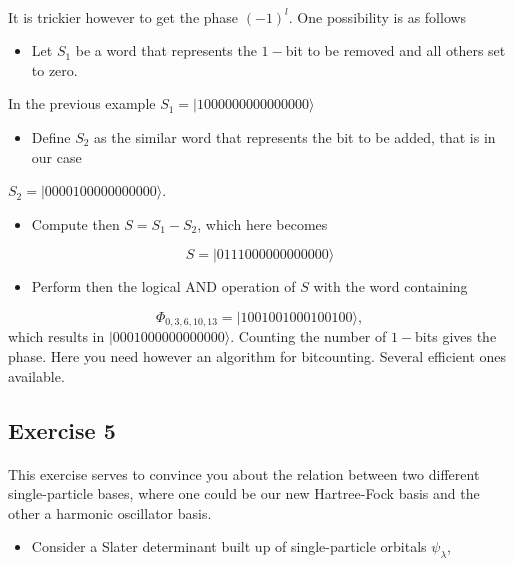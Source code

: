 \documentclass[%
twoside,                 %
final,                   %
10pt]{article}
\begin{document}
\paragraph{}
It is trickier however to get the phase $(-1)^l$. 
One possibility is as follows
\begin{itemize}
\item Let $S_1$ be a word that represents the $1-$bit to be removed and all others set to zero.
\end{itemize}

\noindent
In the previous example $S_1=|1000000000000000\rangle$
\begin{itemize}
\item Define $S_2$ as the similar word that represents the bit to be added, that is in our case
\end{itemize}

\noindent
$S_2=|0000100000000000\rangle$.
\begin{itemize}
\item Compute then $S=S_1-S_2$, which here becomes
\end{itemize}

\noindent
\[
S=|0111000000000000\rangle
\]
\begin{itemize}
\item Perform then the logical AND operation of $S$ with the word containing 
\end{itemize}

\noindent
\[
\Phi_{0,3,6,10,13} = |1001001000100100\rangle,
\]
which results in $|0001000000000000\rangle$. Counting the number of $1-$bits gives the phase.  Here you need however an algorithm for bitcounting. Several efficient ones available.



\subsection*{Exercise 5}

\paragraph{}
This exercise serves to convince you about the relation between
two different single-particle bases, where one could be our new Hartree-Fock basis and the other a harmonic oscillator basis.
\begin{itemize}
\item Consider a Slater determinant built up of single-particle orbitals $\psi_{\lambda}$, 
\end{itemize}
\end{document}
